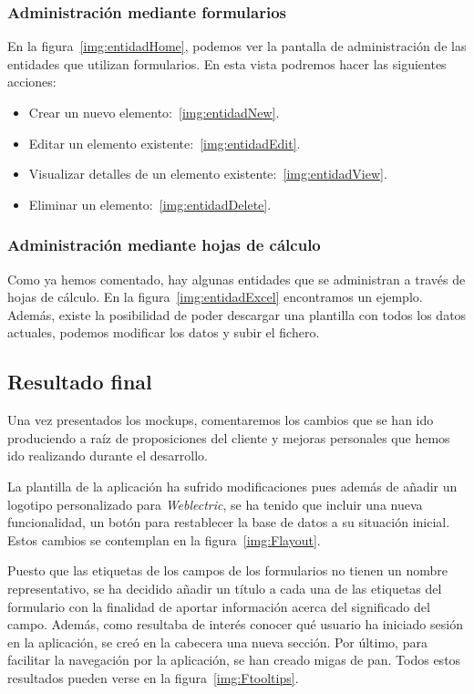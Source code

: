 \subsubsection{Administración mediante formularios} 

En la figura~\ref{img:entidadHome}, podemos ver la pantalla de administración de las entidades que utilizan formularios. En esta vista podremos hacer las siguientes acciones:

\begin{itemize}
	\item Crear un nuevo elemento:~\ref{img:entidadNew}.
	\item Editar un elemento existente:~\ref{img:entidadEdit}.
	\item Visualizar detalles de un elemento existente:~\ref{img:entidadView}.
	\item Eliminar un elemento:~\ref{img:entidadDelete}.
\end{itemize}

\subsubsection{Administración mediante hojas de cálculo} 

Como ya hemos comentado, hay algunas entidades que se administran a través de hojas de cálculo. En la figura~\ref{img:entidadExcel} encontramos un ejemplo. Además, existe la posibilidad de poder descargar una plantilla con todos los datos actuales, podemos modificar los datos y subir el fichero. 

\newpage

\subsection{Resultado final} 

Una vez presentados los mockups, comentaremos los cambios que se han ido produciendo a raíz de proposiciones del cliente y mejoras personales que hemos ido realizando durante el desarrollo.

La plantilla de la aplicación ha sufrido modificaciones pues además de añadir un logotipo personalizado para \textit{Weblectric}, se ha tenido que incluir una nueva funcionalidad, un botón para restablecer la base de datos a su situación inicial. Estos cambios se contemplan en la figura~\ref{img:Flayout}.

Puesto que las etiquetas de los campos de los formularios no tienen un nombre representativo, se ha decidido añadir un título a cada una de las etiquetas del formulario con la finalidad de aportar información acerca del significado del campo. Además, como resultaba de interés conocer qué usuario ha iniciado sesión en la aplicación, se creó en la cabecera una nueva sección. Por último, para facilitar la navegación por la aplicación, se han creado migas de pan. Todos estos resultados pueden verse en la figura~\ref{img:Ftooltips}.

